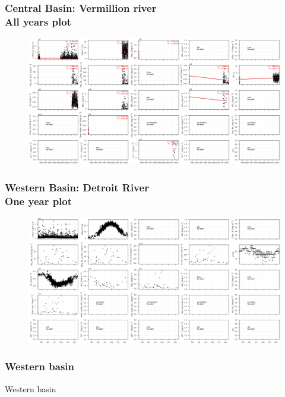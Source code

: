 \documentclass{beamer}
\begin{document}
\begin{frame}
\frametitle{Central Basin: Vermillion river\\ All years plot}
\begin{figure}
\includegraphics[width=\textwidth]{rivers/Central basin/plot_all vermillion.png}
\end{figure}
\end{frame}

\begin{frame}
\frametitle{Western Basin: Detroit River\\ One year plot}
\begin{figure}
\includegraphics[width=\textwidth]{rivers/Western basin/plot_1yr detroitriver.png}
\end{figure}
\end{frame}


\subsubsection{Western basin}

\begin{frame}
\begin{center}
\Huge Western basin
\end{center}
\end{frame}
\end{document}
